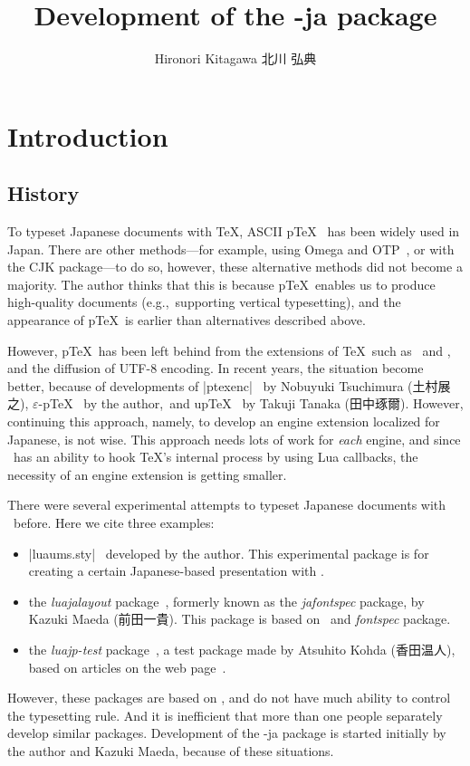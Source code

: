 \documentclass{ajt}
\title{Development of the \LuaTeX-ja package}
\author{Hironori Kitagawa {\normalsize 北川 弘典}}
\begin{document}
\maketitle

\section{Introduction}
\subsection{History}
To typeset Japanese documents with \TeX, ASCII p\TeX~\cite{ptex} has
been widely used in Japan.  There are other methods---for example, using
Omega and OTP~\cite{omega}, or with the CJK package---to do so, however,
these alternative methods did not become a majority.  The author thinks
that this is because p\TeX\ enables us to produce high-quality documents
(e.g.,~supporting vertical typesetting), and the appearance of p\TeX\ is
earlier than alternatives described above.

However, p\TeX\ has been left behind from the extensions of \TeX\
such as \eTeX\ and \pdfTeX, and the diffusion of UTF-8 encoding.  In
recent years, the situation become better, because of developments
of |ptexenc|~\cite{ptexenc} by Nobuyuki Tsuchimura (\hbox{土村展之}),
$\varepsilon$-p\TeX~\cite{eptex} by the author,~and up\TeX~\cite{uptex}
by Takuji Tanaka (田中琢爾). However, continuing this approach, namely, to develop
an engine extension localized for Japanese, is not wise. This approach
needs lots of work for \emph{each} engine, and since \LuaTeX\ has an ability
to hook \TeX's internal process by using Lua callbacks, the necessity of
an engine extension is getting smaller.


There were several experimental attempts to typeset
Japanese documents with \LuaTeX\ before. Here we cite three examples:
\begin{itemize}
\item |luaums.sty|~\cite{luaums} developed by the author. This
      experimental package is for creating a certain Japanese-based presentation
      with \LuaTeX.
\item the \emph{luajalayout} package~\cite{luajalayout}, formerly known as the
      \emph{jafontspec} package, by Kazuki Maeda (前田一貴). This package is based on
      \LaTeXe\ and \emph{fontspec} package.
\item the \emph{luajp-test} package~\cite{luajp-test}, a test package made by
      Atsuhito Kohda (香田温人), based on articles on the web page~\cite{joylua}.
\end{itemize}
However, these packages are based on \LaTeXe, and do not have much
ability to control the typesetting rule. And it is inefficient that more
than one people separately develop similar packages.  Development of the
\LuaTeX-ja package is started initially by the author and Kazuki Maeda, because of
these situations.
\end{document}
